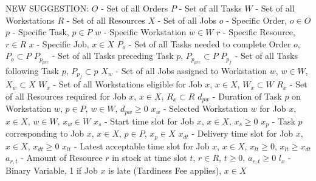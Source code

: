 \documentclass[a4paper,12pt,twoside]{scrreprt}
\begin{document}
\begin{flushleft}
NEW SUGGESTION: \linebreak
$O$ - Set of all Orders \linebreak
$P$ - Set of all Tasks \linebreak
$W$ - Set of all Workstations \linebreak
$R$ - Set of all Resources \linebreak
$X$ - Set of all Jobs \linebreak
$o$ - Specific Order, $o \in O$\linebreak
$p$ - Specific Task, $p \in P$\linebreak
$w$ - Specific Workstation $w \in W$ \linebreak
$r$ - Specific Resource, $r \in R$ \linebreak
$x$ - Specific Job, $x \in X$ \linebreak
$P_{o}$ - Set of all Tasks needed to complete Order $o$, $P_{o} \subset P$ \linebreak
$P_{p_{pre}}$ - Set of all Tasks preceding Task $p$, $P_{p_{pre}} \subset P$ \linebreak
$P_{p_f}$ - Set of all Tasks following Task $p$, $P_{p_{f}} \subset p$ \linebreak
$X_{w}$ - Set of all Jobs assigned to Workstation $w$, $w \in W$, $X_{w} \subset X$ \linebreak
$W_{x}$ - Set of all Workstations eligible for Job $x$, $x \in X$, $W_{x} \subset W$ \linebreak
$R_{x}$ - Set of all Resources required for Job $x$, $x \in X$, $R_{x} \subset R$ \linebreak
$d_{pw}$ - Duration of Task $p$ on Workstation $w$, $p \in P$, $w \in W$, $d_{pw} \geq 0$ \linebreak
$x_{w}$ - Selected Workstation $w$ for Job $x$, $x \in X$, $w \in W$, $x_{w} \in W$ \linebreak
$x_{s}$ - Start time slot for Job $x$, $x \in X$, $x_{s} \geq 0$ \linebreak
$x_{p}$ - Task $p$ corresponding to Job $x$, $x \in X$, $p \in P$, $x_{p} \in X$ \linebreak
$x_{dt}$ - Delivery time slot for Job $x$, $x \in X$, $x_{dt} \geq 0$ \linebreak
$x_{lt}$ - Latest acceptable time slot for Job $x$, $x \in X$, $x_{lt} \geq 0$, $x_{lt} \geq x_{dt}$ \linebreak
$a_{r,t}$ - Amount of Resource $r$ in stock at time slot $t$, $r \in R$, $t \geq 0$, $a_{r,t} \geq 0$ \linebreak
$l_{x}$ - Binary Variable, 1 if Job $x$ is late (Tardiness Fee applies), $x \in X$ \linebreak

\end{flushleft}
\end{document}
